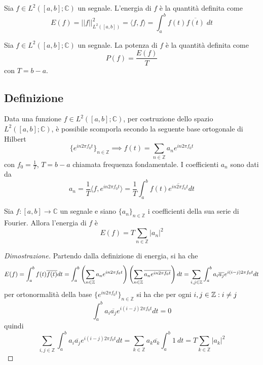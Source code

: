         \begin{definition}
            Sia $f \in L^2([a, b]; \mathbb{C})$ un segnale.
            L'energia di $f$ è la quantità definita come
            \[
                E(f) = ||f||^{2}_{L^2([a, b])} = \langle f, f \rangle = \int_{a}^{b} f(t) \overline{f(t)} \; dt
            \]
        \end{definition}

        \begin{definition}
            Sia $f \in L^2([a, b]; \mathbb{C})$ un segnale.
            La potenza di $f$ è la quantità definita come
            \[
                P(f) = \frac{E(f)}{T}
            \]
            con $T = b - a$. 
        \end{definition}


    \subsection{Definizione}
        Data una funzione $f \in L^{2}([a, b]; \mathbb{C})$, per costruzione dello spazio $L^{2}([a, b]; \mathbb{C})$, è possibile scomporla secondo la seguente base ortogonale di Hilbert
        \[
            \{e^{in 2 \pi f_0 t}\}_{n \in \mathbb{Z}} \implies f(t) = \sum_{n \in \mathbb{Z}} a_{n} e^{in 2 \pi f_0 t}
        \]
        con $f_0 = \frac{1}{T}$, $T = b - a$ chiamata frequenza fondamentale. I coefficienti $a_n$ sono dati da
        \[
            a_{n} = \frac{1}{T} \langle f, e^{in 2 \pi f_0 t} \rangle = \frac{1}{T} \int_{a}^{b} f(t) \overline{e^{in 2 \pi f_0 t}} dt
        \]

        \begin{proposition}
            Sia $f: [a, b] \rightarrow \mathbb{C}$ un segnale e siano $\{a_n\}_{n \in \mathbb{Z}}$ i coefficienti della sua serie di Fourier.
            Allora l'energia di $f$ è
            \[
                E(f) = T \sum_{n \in \mathbb{Z}} |a_n|^2
            \]
        \end{proposition}

        \begin{proof}[Dimostrazione]
            Partendo dalla definizione di energia, si ha che
            \[
                E(f) = \int_{a}^{b} f(t) \overline{f(t)} dt = \int_{a}^{b} \qty(\sum_{n \in \mathbb{Z}} a_n e^{in 2\pi f_0 t}) \qty(\sum_{n \in \mathbb{Z}} \overline{a_n e^{in 2\pi f_0 t}}) dt = \sum_{i, j \in \mathbb{Z}} \int_{a}^{b} a_i \overline{a_j} e^{i (i - j) 2 \pi f_0 t} dt
            \]
            per ortonormalità della base $\{e^{in 2 \pi f_0 t}\}_{n \in \mathbb{Z}}$ si ha che per ogni $i, j \in \mathbb{Z} \mathrel{:} i \neq j$
            \[
                \int_{a}^{b} a_i \overline{a_j} e^{i (i - j) 2 \pi f_0 t} dt = 0
            \]
            quindi
            \[
                \sum_{i, j \in \mathbb{Z}} \int_{a}^{b} a_i \overline{a_j} e^{i (i - j) 2 \pi f_0 t} dt = \sum_{k \in \mathbb{Z}} a_k \overline{a_k} \int_{a}^{b} 1 \: dt = T \sum_{k \in \mathbb{Z}} |a_k|^2
            \]
        \end{proof}


